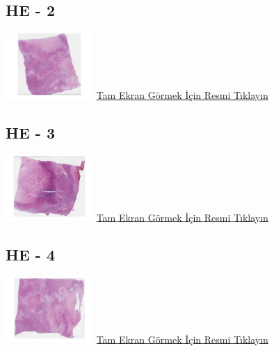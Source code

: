 \documentclass[
  letterpaper,
  DIV=11,
  numbers=noendperiod]{scrreprt}
\begin{document}
\hypertarget{he---2-1}{%
\subsection{HE - 2}\label{he---2-1}}

\href{https://images.patolojiatlasi.com/fibrolamellar-hepatocellular-carcinoma/HE2.html}{\includegraphics[width=0.25\textwidth,height=\textheight]{./screenshots/thumbnail_fibrolamellar-hepatocellular-carcinoma-2.png}}
\href{https://images.patolojiatlasi.com/fibrolamellar-hepatocellular-carcinoma/HE2.html}{Tam
Ekran Görmek İçin Resmi Tıklayın}

\hypertarget{he---3-1}{%
\subsection{HE - 3}\label{he---3-1}}

\href{https://images.patolojiatlasi.com/fibrolamellar-hepatocellular-carcinoma/HE3.html}{\includegraphics[width=0.25\textwidth,height=\textheight]{./screenshots/thumbnail_fibrolamellar-hepatocellular-carcinoma-3.png}}
\href{https://images.patolojiatlasi.com/fibrolamellar-hepatocellular-carcinoma/HE3.html}{Tam
Ekran Görmek İçin Resmi Tıklayın}

\hypertarget{he---4-1}{%
\subsection{HE - 4}\label{he---4-1}}

\href{https://images.patolojiatlasi.com/fibrolamellar-hepatocellular-carcinoma/HE4.html}{\includegraphics[width=0.25\textwidth,height=\textheight]{./screenshots/thumbnail_fibrolamellar-hepatocellular-carcinoma-4.png}}
\href{https://images.patolojiatlasi.com/fibrolamellar-hepatocellular-carcinoma/HE4.html}{Tam
Ekran Görmek İçin Resmi Tıklayın}
\end{document}

